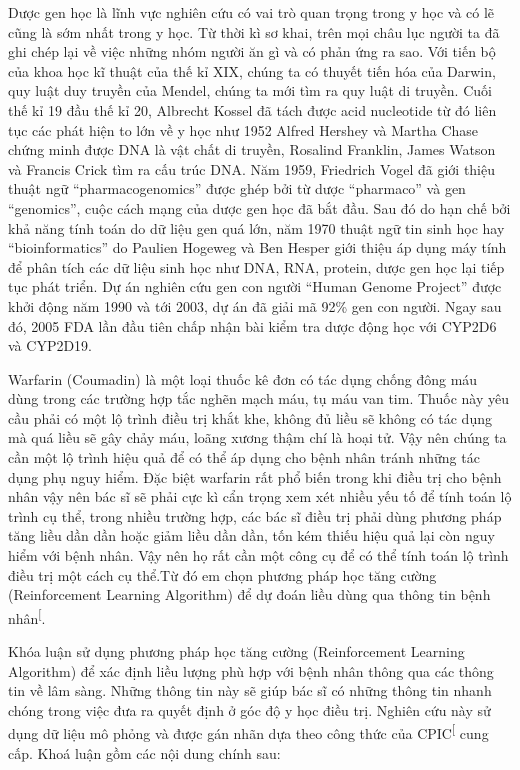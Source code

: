 \documentclass[14pt,oneside]{scrbook}
\begin{document}
Dược gen học là lĩnh vực nghiên cứu có vai trò quan trọng trong y học và
có lẽ cũng là sớm nhất trong y học. Từ thời kì sơ khai, trên mọi châu
lục người ta đã ghi chép lại về việc những nhóm người ăn gì và có phản
ứng ra sao. Với tiến bộ của khoa học kĩ thuật của thế kỉ XIX, chúng ta
có thuyết tiến hóa của Darwin, quy luật duy truyền của Mendel, chúng ta
mới tìm ra quy luật di truyền. Cuối thế kỉ 19 đầu thế kỉ 20, Albrecht
Kossel đã tách được acid nucleotide từ đó liên tục các phát hiện to lớn
về y học như 1952 Alfred Hershey và Martha Chase chứng minh được DNA là
vật chất di truyền, Rosalind Franklin, James Watson và Francis Crick tìm
ra cấu trúc DNA. Năm 1959, Friedrich Vogel đã giới thiệu thuật ngữ
``pharmacogenomics'' được ghép bởi từ dược ``pharmaco'' và gen
``genomics'', cuộc cách mạng của dược gen học đã bắt đầu. Sau đó do hạn
chế bởi khả năng tính toán do dữ liệu gen quá lớn, năm 1970 thuật ngữ
tin sinh học hay ``bioinformatics'' do Paulien Hogeweg và Ben Hesper
giới thiệu áp dụng máy tính để phân tích các dữ liệu sinh học như DNA,
RNA, protein, dược gen học lại tiếp tục phát triển. Dự án nghiên cứu gen
con người ``Human Genome Project'' được khởi động năm 1990 và tới 2003,
dự án đã giải mã 92\% gen con người. Ngay sau đó, 2005 FDA lần đầu tiên
chấp nhận bài kiểm tra dược động học với CYP2D6 và CYP2D19.

Warfarin (Coumadin) là một loại thuốc kê đơn có tác dụng chống đông máu
dùng trong các trường hợp tắc nghẽn mạch máu, tụ máu van tim. Thuốc này
yêu cầu phải có một lộ trình điều trị khắt khe, không đủ liều sẽ không
có tác dụng mà quá liều sẽ gây chảy máu, loãng xương thậm chí là hoại
tử. Vậy nên chúng ta cần một lộ trình hiệu quả để có thể áp dụng cho
bệnh nhân tránh những tác dụng phụ nguy hiểm. Đặc biệt warfarin rất phổ
biến trong khi điều trị cho bệnh nhân vậy nên bác sĩ sẽ phải cực kì cẩn
trọng xem xét nhiều yếu tố để tính toán lộ trình cụ thể, trong nhiều
trường hợp, các bác sĩ điều trị phải dùng phương pháp tăng liều dần dần
hoặc giảm liều dần dần, tốn kém thiếu hiệu quả lại còn nguy hiểm với
bệnh nhân. Vậy nên họ rất cần một công cụ để có thể tính toán lộ trình
điều trị một cách cụ thể.Từ đó em chọn phương pháp học tăng cường
(Reinforcement Learning Algorithm) để dự đoán liều dùng qua thông tin
bệnh nhân\textsuperscript{{[}\citeproc{ref-warfarin1}{1}{]}}.

Khóa luận sử dụng phương pháp học tăng cường (Reinforcement Learning
Algorithm) để xác định liều lượng phù hợp với bệnh nhân thông qua các
thông tin về lâm sàng. Những thông tin này sẽ giúp bác sĩ có những thông
tin nhanh chóng trong việc đưa ra quyết định ở góc độ y học điều trị.
Nghiên cứu này sử dụng dữ liệu mô phỏng và được gán nhãn dựa theo công
thức của CPIC\textsuperscript{{[}\citeproc{ref-cpic}{2}{]}} cung cấp. Khoá luận
gồm các nội dung chính sau:
\end{document}
